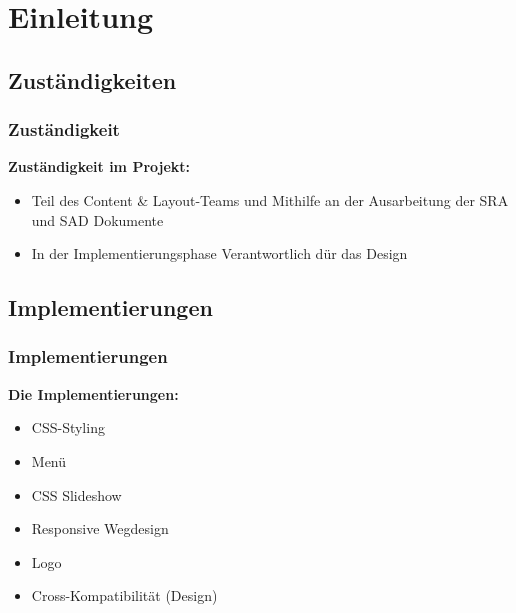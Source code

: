 \section{Einleitung} %
\subsection{Zust\"andigkeiten} %
\begin{frame} %
 \frametitle{Zuständigkeit} %
\textbf{Zuständigkeit im Projekt:} 
 \begin{itemize}
\bigskip

\item Teil des Content \& Layout-Teams und Mithilfe an der Ausarbeitung der SRA und SAD Dokumente
\item In der Implementierungsphase Verantwortlich dür das Design


 \end{itemize}

\end{frame}


\subsection{Implementierungen}
\begin{frame} %
\frametitle{Implementierungen} %

\textbf{Die Implementierungen:}
\bigskip

  \begin{itemize}

      \item CSS-Styling
      \item Menü
      \item CSS Slideshow
      \item Responsive Wegdesign
      \item Logo
     \item Cross-Kompatibilität (Design)

  \end{itemize}

\end{frame}
